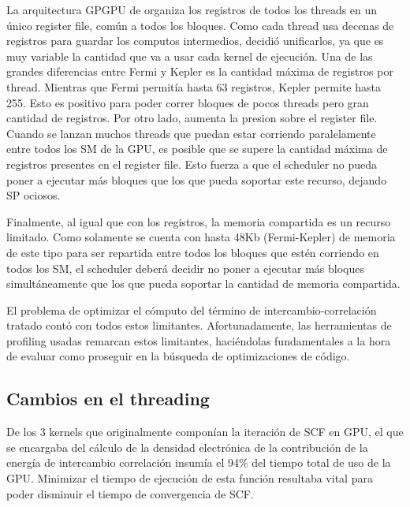La arquitectura GPGPU de \nvidia organiza los registros de todos los threads en un \'unico
register file, com\'un a todos los bloques. Como cada thread usa decenas de registros para guardar
los computos intermedios, \nvidia decidi\'o unificarlos, ya que es muy variable la cantidad que va a usar
cada kernel de ejecuci\'on. Una de las grandes diferencias entre Fermi y Kepler es la cantidad m\'axima de
registros por thread. Mientras que Fermi permit\'ia hasta 63 registros, Kepler permite hasta 255. Esto
es positivo para poder correr bloques de pocos threads pero gran cantidad de registros. Por otro lado,
aumenta la presion sobre el register file. Cuando se lanzan muchos threads
que puedan estar corriendo paralelamente entre todos los SM de la GPU, es posible que se supere
la cantidad m\'axima de registros presentes en el register file. Esto fuerza a que el scheduler
no pueda poner a ejecutar m\'as bloques que los que pueda soportar este recurso, dejando SP ociosos.

Finalmente, al igual que con los registros, la memoria compartida es un recurso limitado. Como
solamente se cuenta con hasta 48Kb (Fermi-Kepler) de memoria de este tipo para ser repartida entre
todos los bloques que est\'en corriendo en todos los SM, el scheduler deber\'a decidir no poner a ejecutar
m\'as bloques simult\'aneamente que los que pueda soportar la cantidad de memoria compartida.

El problema de optimizar el c\'omputo del t\'ermino de intercambio-correlaci\'on tratado  cont\'o
con todos estos limitantes. Afortunadamente,
las herramientas de profiling usadas remarcan estos limitantes, haci\'endolas
fundamentales a la hora de evaluar como proseguir en la b\'usqueda de optimizaciones de c\'odigo.

\subsection{Cambios en el threading}

De los 3 kernels que originalmente compon\'ian la iteraci\'on de SCF en GPU, el que se encargaba
del c\'alculo de la densidad electr\'onica de la contribuci\'on de la energ\'ia de intercambio correlaci\'on
insum\'ia el 94\% del tiempo total de uso de la GPU. Minimizar el tiempo de ejecuci\'on de
esta funci\'on resultaba vital para poder disminuir el tiempo de convergencia de SCF.

